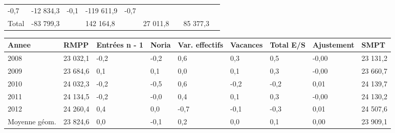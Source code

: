 \begin{longtable}[]{@{}lllllllll@{}}
\begin{minipage}[t]{0.06\columnwidth}
-0,7\strut
\end{minipage} & \begin{minipage}[t]{0.12\columnwidth}\raggedright
-12 834,3\strut
\end{minipage} & \begin{minipage}[t]{0.06\columnwidth}\raggedright
-0,1\strut
\end{minipage} & \begin{minipage}[t]{0.09\columnwidth}\raggedright
-119 611,9\strut
\end{minipage} & \begin{minipage}[t]{0.06\columnwidth}\raggedright
-0,7\strut
\end{minipage}\tabularnewline
\begin{minipage}[t]{0.05\columnwidth}\raggedright
Total\strut
\end{minipage} & \begin{minipage}[t]{0.10\columnwidth}\raggedright
-83 799,3\strut
\end{minipage} & \begin{minipage}[t]{0.06\columnwidth}\raggedright
\strut
\end{minipage} & \begin{minipage}[t]{0.16\columnwidth}\raggedright
142 164,8\strut
\end{minipage} & \begin{minipage}[t]{0.06\columnwidth}\raggedright
\strut
\end{minipage} & \begin{minipage}[t]{0.12\columnwidth}\raggedright
27 011,8\strut
\end{minipage} & \begin{minipage}[t]{0.06\columnwidth}\raggedright
\strut
\end{minipage} & \begin{minipage}[t]{0.09\columnwidth}\raggedright
85 377,3\strut
\end{minipage} & \begin{minipage}[t]{0.06\columnwidth}\raggedright
\strut
\end{minipage}\tabularnewline
\bottomrule
\end{longtable}

\begin{longtable}[]{@{}lllllllll@{}}
\toprule
Annee & RMPP & Entrées n - 1 & Noria & Var. effectifs & Vacances & Total
E/S & Ajustement & SMPT\tabularnewline
\midrule
\endhead
2008 & 23 032,1 & -0,2 & -0,2 & 0,6 & 0,3 & 0,5 & -0,00 & 23
131,2\tabularnewline
2009 & 23 684,6 & 0,1 & 0,1 & 0,0 & 0,1 & 0,3 & -0,00 & 23
660,7\tabularnewline
2010 & 24 032,3 & -0,2 & -0,5 & 0,6 & -0,2 & -0,2 & 0,01 & 24
139,7\tabularnewline
2011 & 24 134,5 & -0,2 & -0,0 & 0,4 & 0,1 & 0,3 & -0,00 & 24
130,2\tabularnewline
2012 & 24 260,4 & 0,4 & 0,0 & -0,7 & -0,1 & -0,3 & 0,01 & 24
507,6\tabularnewline
Moyenne géom. & 23 824,6 & 0,0 & -0,1 & 0,2 & 0,0 & 0,1 & 0,00 & 23
909,1\tabularnewline
\bottomrule
\end{longtable}

